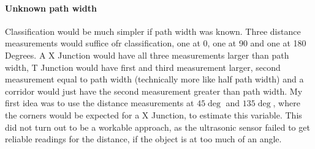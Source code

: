 
\paragraph{Unknown path width}
Classification would be much simpler if path width was known. Three distance measurements would suffice ofr classification, one at 0, one at 90 and one at 180 Degrees.
A X Junction would have all three measurements larger than path width,
T Junction would have first and third measurement larger, second measurement equal to path width (technically more like half path width) and
a corridor would just have the second measurement greater than path width.
My first idea was to use the distance measurements at $45\deg$ and $135\deg$, where the corners would be expected for a X Junction, to estimate this variable.
This did not turn out to be a workable approach, as the ultrasonic sensor failed to get reliable readings for the distance, if the object is at too much of an angle.
